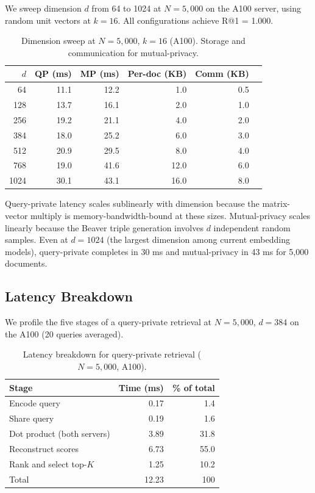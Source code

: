 \documentclass[11pt]{article}
\begin{document}
We sweep dimension $d$ from 64 to 1024 at $N = 5{,}000$ on the A100 server, using random unit vectors at $k = 16$. All configurations achieve R@1 = 1.000.

\begin{table}[h]
\centering
\caption{Dimension sweep at $N = 5{,}000$, $k = 16$ (A100). Storage and communication for mutual-privacy.}
\label{tab:dimension}
\begin{tabular}{rrrrrr}
\toprule
$d$ & QP (ms) & MP (ms) & Per-doc (KB) & Comm (KB) \\
\midrule
64 & 11.1 & 12.2 & 1.0 & 0.5 \\
128 & 13.7 & 16.1 & 2.0 & 1.0 \\
256 & 19.2 & 21.1 & 4.0 & 2.0 \\
384 & 18.0 & 25.2 & 6.0 & 3.0 \\
512 & 20.9 & 29.5 & 8.0 & 4.0 \\
768 & 19.0 & 41.6 & 12.0 & 6.0 \\
1024 & 30.1 & 43.1 & 16.0 & 8.0 \\
\bottomrule
\end{tabular}
\end{table}

Query-private latency scales sublinearly with dimension because the matrix-vector multiply is memory-bandwidth-bound at these sizes. Mutual-privacy scales linearly because the Beaver triple generation involves $d$ independent random samples. Even at $d = 1024$ (the largest dimension among current embedding models), query-private completes in 30 ms and mutual-privacy in 43 ms for 5{,}000 documents.

\subsection{Latency Breakdown}

We profile the five stages of a query-private retrieval at $N = 5{,}000$, $d = 384$ on the A100 (20 queries averaged).

\begin{table}[h]
\centering
\caption{Latency breakdown for query-private retrieval ($N = 5{,}000$, A100).}
\label{tab:breakdown}
\begin{tabular}{lrr}
\toprule
Stage & Time (ms) & \% of total \\
\midrule
Encode query & 0.17 & 1.4 \\
Share query & 0.19 & 1.6 \\
Dot product (both servers) & 3.89 & 31.8 \\
Reconstruct scores & 6.73 & 55.0 \\
Rank and select top-$K$ & 1.25 & 10.2 \\
\midrule
Total & 12.23 & 100 \\
\bottomrule
\end{tabular}
\end{table}
\end{document}
